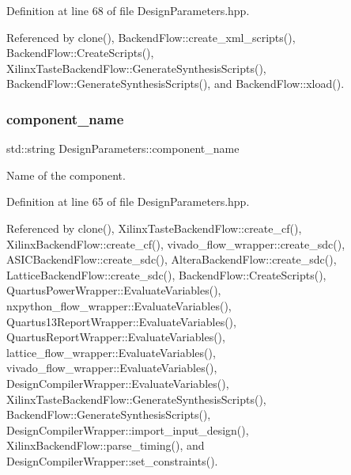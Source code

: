 Definition at line 68 of file Design\+Parameters.\+hpp.



Referenced by clone(), Backend\+Flow\+::create\+\_\+xml\+\_\+scripts(), Backend\+Flow\+::\+Create\+Scripts(), Xilinx\+Taste\+Backend\+Flow\+::\+Generate\+Synthesis\+Scripts(), Backend\+Flow\+::\+Generate\+Synthesis\+Scripts(), and Backend\+Flow\+::xload().

\mbox{\label{structDesignParameters_af42b3f5eebf08f494f102114d631a29a}} 
\subsubsection{\texorpdfstring{component\+\_\+name}{component\_name}}
{\footnotesize\ttfamily std\+::string Design\+Parameters\+::component\+\_\+name}



Name of the component. 



Definition at line 65 of file Design\+Parameters.\+hpp.



Referenced by clone(), Xilinx\+Taste\+Backend\+Flow\+::create\+\_\+cf(), Xilinx\+Backend\+Flow\+::create\+\_\+cf(), vivado\+\_\+flow\+\_\+wrapper\+::create\+\_\+sdc(), A\+S\+I\+C\+Backend\+Flow\+::create\+\_\+sdc(), Altera\+Backend\+Flow\+::create\+\_\+sdc(), Lattice\+Backend\+Flow\+::create\+\_\+sdc(), Backend\+Flow\+::\+Create\+Scripts(), Quartus\+Power\+Wrapper\+::\+Evaluate\+Variables(), nxpython\+\_\+flow\+\_\+wrapper\+::\+Evaluate\+Variables(), Quartus13\+Report\+Wrapper\+::\+Evaluate\+Variables(), Quartus\+Report\+Wrapper\+::\+Evaluate\+Variables(), lattice\+\_\+flow\+\_\+wrapper\+::\+Evaluate\+Variables(), vivado\+\_\+flow\+\_\+wrapper\+::\+Evaluate\+Variables(), Design\+Compiler\+Wrapper\+::\+Evaluate\+Variables(), Xilinx\+Taste\+Backend\+Flow\+::\+Generate\+Synthesis\+Scripts(), Backend\+Flow\+::\+Generate\+Synthesis\+Scripts(), Design\+Compiler\+Wrapper\+::import\+\_\+input\+\_\+design(), Xilinx\+Backend\+Flow\+::parse\+\_\+timing(), and Design\+Compiler\+Wrapper\+::set\+\_\+constraints().

\mbox{\label{structDesignParameters_a683faf438381e5a848a3411db1abed59}} 
